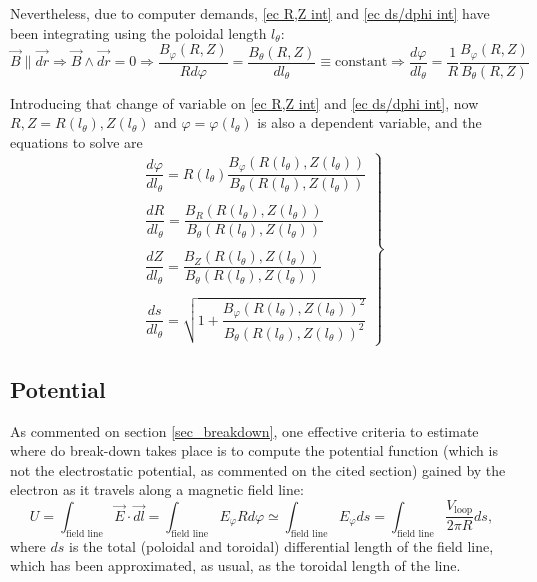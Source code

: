 \documentclass[a4paper,12pt,oneside]{book}
\begin{document}

Nevertheless, due to computer demands, \eqref{ec R,Z int} and \eqref{ec ds/dphi int} have been integrating using the poloidal length $l_\theta$:
%
\begin{equation}
\vec{B} \parallel \vec{dr} \Rightarrow\vec{B} \wedge \vec{dr}=0 \Rightarrow \dfrac{B_{\varphi}(R,Z)}{R d\varphi}= \dfrac{B_\theta(R,Z)}{d l_\theta} \equiv \text{constant} \Rightarrow \dfrac{d \varphi}{d l_\theta}=\dfrac{1}{R} \dfrac{B_{\varphi}(R,Z)}{B_\theta(R,Z)}
\end{equation}

Introducing that change of variable on \eqref{ec R,Z int} and \eqref{ec ds/dphi int}, now $R,Z=R(l_\theta),Z(l_\theta)$ and $\varphi=\varphi(l_\theta)$ is also a dependent variable, and the equations to solve are
%
\begin{equation}\label{ec_para_integrar_L}
	\left.
	\begin{array}{c}
	\dfrac{d \varphi}{d l_\theta}= R(l_\theta) \dfrac{B_\varphi(R(l_\theta),Z(l_\theta))}{B_\theta (R(l_\theta),Z(l_\theta))} \\ 
	\\
		\dfrac{dR}{d l_\theta}= \dfrac{B_R(R(l_\theta),Z(l_\theta))}{B_\theta (R(l_\theta),Z(l_\theta))} \\ 
	\\
\dfrac{dZ}{d l_\theta}= \dfrac{B_Z(R(l_\theta),Z(l_\theta))}{B_\theta(R(l_\theta),Z(l_\theta))}  \\
	\\
	\dfrac{ds}{d l_\theta}= \sqrt{1+\dfrac{B_\varphi (R(l_\theta),Z(l_\theta))^2}{B_\theta (R(l_\theta),Z(l_\theta))^2}}
	\end{array}
	\right\}
\end{equation}

\subsection{Potential}

As commented on section \ref{sec_breakdown}, one effective criteria to estimate where do break-down takes place is to compute the potential function (which is not the electrostatic potential, as commented on the cited section) gained by the electron as it travels along a magnetic field line:
%
\begin{equation}\label{ec_potential_int}
U= \int_\text{field line} \vec{E} \cdot \vec{dl} = \int_\text{field line} E_\varphi R d\varphi \simeq \int_\text{field line} E_\varphi  ds=  \int_\text{field line} \dfrac{V_\text{loop}}{2 \pi R} ds,
\end{equation}
where $ds$ is the total (poloidal and toroidal) differential length of the field line, which has been approximated, as usual, as the toroidal length of the line. 
\end{document}
